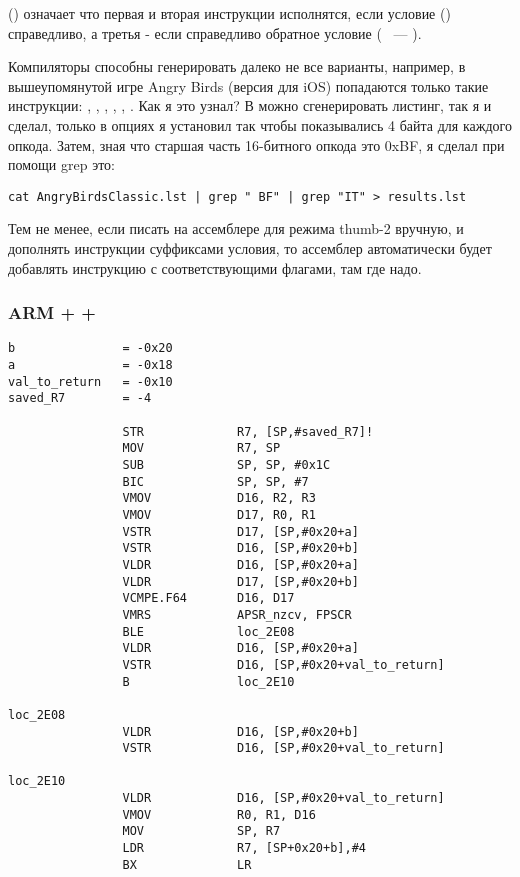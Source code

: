  () означает что первая и вторая инструкции исполнятся, если 
условие  () справедливо,
а третья - если справедливо обратное условие ( ~--- ).

Компиляторы способны генерировать далеко не все варианты, например, в вышеупомянутой игре Angry Birds
(версия  для iOS) попадаются только такие инструкции: , , , , 
, .
Как я это узнал? В \IDA можно сгенерировать листинг, так я и сделал, только в опциях я установил так 
чтобы показывались 4 байта для каждого опкода. Затем, зная что старшая часть 16-битного опкода  
это 0xBF, я сделал при помощи grep это:

\begin{lstlisting}
cat AngryBirdsClassic.lst | grep " BF" | grep "IT" > results.lst
\end{lstlisting}

Тем не менее, если писать на ассемблере для режима thumb-2 вручную, и дополнять инструкции суффиксами
условия, то ассемблер автоматически будет добавлять инструкцию  с соответствующими флагами, там
где надо.

\subsubsection{ARM + \NonOptimizingXcode + \ARMMode}

\begin{lstlisting}
b               = -0x20
a               = -0x18
val_to_return   = -0x10
saved_R7        = -4

                STR             R7, [SP,#saved_R7]!
                MOV             R7, SP
                SUB             SP, SP, #0x1C
                BIC             SP, SP, #7
                VMOV            D16, R2, R3
                VMOV            D17, R0, R1
                VSTR            D17, [SP,#0x20+a]
                VSTR            D16, [SP,#0x20+b]
                VLDR            D16, [SP,#0x20+a]
                VLDR            D17, [SP,#0x20+b]
                VCMPE.F64       D16, D17
                VMRS            APSR_nzcv, FPSCR
                BLE             loc_2E08
                VLDR            D16, [SP,#0x20+a]
                VSTR            D16, [SP,#0x20+val_to_return]
                B               loc_2E10

loc_2E08
                VLDR            D16, [SP,#0x20+b]
                VSTR            D16, [SP,#0x20+val_to_return]

loc_2E10
                VLDR            D16, [SP,#0x20+val_to_return]
                VMOV            R0, R1, D16
                MOV             SP, R7
                LDR             R7, [SP+0x20+b],#4
                BX              LR
\end{lstlisting}


